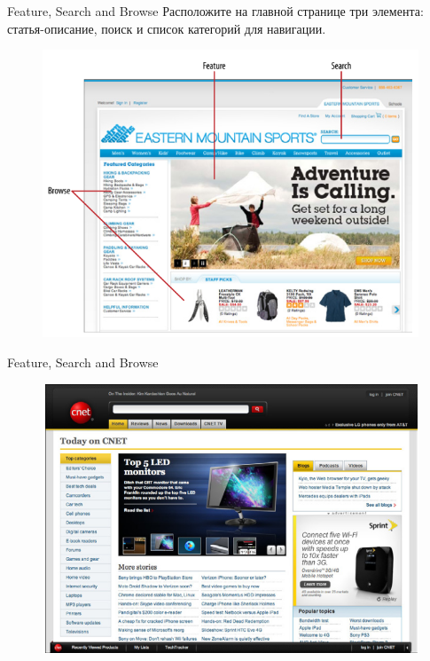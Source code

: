 \documentclass{beamer}
\begin{document}
\begin{frame}[t]{Feature, Search and Browse}
	Расположите на главной странице три элемента: статья-описание, поиск и список категорий для навигации.
	\begin{figure}[h]
		\centering
		\includegraphics[scale=0.5]{images/lec07-pic01.png}
	\end{figure}
\end{frame} 

\begin{frame}[t]{Feature, Search and Browse}
	\begin{figure}[h]
		\centering
		\includegraphics[scale=0.5]{images/lec07-pic02.png}
	\end{figure}
\end{frame} 
\end{document}
